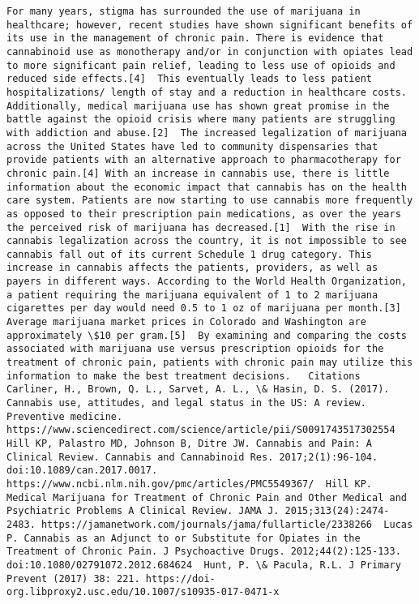 \documentclass[11pt]{article}
\begin{document}
\begin{lstlisting}[mathescape]
For many years, stigma has surrounded the use of marijuana in healthcare; however, recent studies have shown significant benefits of its use in the management of chronic pain. There is evidence that cannabinoid use as monotherapy and/or in conjunction with opiates lead to more significant pain relief, leading to less use of opioids and reduced side effects.[4]  This eventually leads to less patient hospitalizations/ length of stay and a reduction in healthcare costs. Additionally, medical marijuana use has shown great promise in the battle against the opioid crisis where many patients are struggling with addiction and abuse.[2]  The increased legalization of marijuana across the United States have led to community dispensaries that provide patients with an alternative approach to pharmacotherapy for chronic pain.[4] With an increase in cannabis use, there is little information about the economic impact that cannabis has on the health care system. Patients are now starting to use cannabis more frequently as opposed to their prescription pain medications, as over the years the perceived risk of marijuana has decreased.[1]  With the rise in cannabis legalization across the country, it is not impossible to see cannabis fall out of its current Schedule 1 drug category. This increase in cannabis affects the patients, providers, as well as payers in different ways. According to the World Health Organization, a patient requiring the marijuana equivalent of 1 to 2 marijuana cigarettes per day would need 0.5 to 1 oz of marijuana per month.[3]  Average marijuana market prices in Colorado and Washington are approximately \$10 per gram.[5]  By examining and comparing the costs associated with marijuana use versus prescription opioids for the treatment of chronic pain, patients with chronic pain may utilize this information to make the best treatment decisions.   Citations  Carliner, H., Brown, Q. L., Sarvet, A. L., \& Hasin, D. S. (2017). Cannabis use, attitudes, and legal status in the US: A review. Preventive medicine. https://www.sciencedirect.com/science/article/pii/S0091743517302554   Hill KP, Palastro MD, Johnson B, Ditre JW. Cannabis and Pain: A Clinical Review. Cannabis and Cannabinoid Res. 2017;2(1):96-104. doi:10.1089/can.2017.0017.  https://www.ncbi.nlm.nih.gov/pmc/articles/PMC5549367/  Hill KP. Medical Marijuana for Treatment of Chronic Pain and Other Medical and Psychiatric Problems A Clinical Review. JAMA J. 2015;313(24):2474-2483. https://jamanetwork.com/journals/jama/fullarticle/2338266  Lucas P. Cannabis as an Adjunct to or Substitute for Opiates in the Treatment of Chronic Pain. J Psychoactive Drugs. 2012;44(2):125-133. doi:10.1080/02791072.2012.684624  Hunt, P. \& Pacula, R.L. J Primary Prevent (2017) 38: 221. https://doi-org.libproxy2.usc.edu/10.1007/s10935-017-0471-x 
\end{lstlisting}
\hfill
\end{document}
